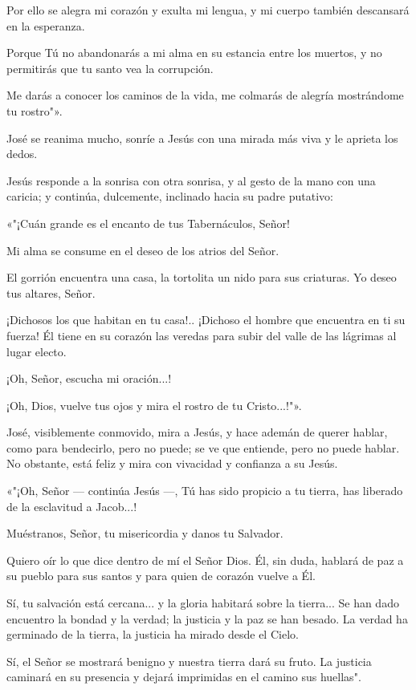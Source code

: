 \documentclass[12pt, twoside, openright]{book} %
\begin{document}
Por ello se alegra mi corazón y exulta mi lengua, y mi cuerpo también descansará en la esperanza. 

Porque Tú no abandonarás a mi alma en su estancia entre los muertos, y no permitirás que tu santo vea la corrupción. 

Me darás a conocer los caminos de la vida, me colmarás de alegría mostrándome tu rostro"». 

José se reanima mucho, sonríe a Jesús con una mirada más viva y le aprieta los dedos. 

Jesús responde a la sonrisa con otra sonrisa, y al gesto de la mano con una caricia; y continúa, dulcemente, inclinado hacia su padre putativo: 

«"¡Cuán grande es el encanto de tus Tabernáculos, Señor! 

Mi alma se consume en el deseo de los atrios del Señor. 

El gorrión encuentra una casa, la tortolita un nido para sus criaturas. Yo deseo tus altares, Señor. 

¡Dichosos los que habitan en tu casa!.. ¡Dichoso el hombre que encuentra en ti su fuerza! Él tiene en su corazón las veredas para subir del valle de las lágrimas al lugar electo. 

¡Oh, Señor, escucha mi oración...! 

¡Oh, Dios, vuelve tus ojos y mira el rostro de tu Cristo...!"». 

José, visiblemente conmovido, mira a Jesús, y hace ademán de querer hablar, como para bendecirlo, pero no puede; se ve que entiende, pero no puede hablar. No obstante, está feliz y mira con vivacidad y confianza a su Jesús. 

«"¡Oh, Señor — continúa Jesús —, Tú has sido propicio a tu tierra, has liberado de la esclavitud a Jacob...! 

Muéstranos, Señor, tu misericordia y danos tu Salvador. 

Quiero oír lo que dice dentro de mí el Señor Dios. Él, sin duda, hablará de paz a su pueblo para sus santos y para quien de corazón vuelve a Él. 

Sí, tu salvación está cercana... y la gloria habitará sobre la tierra... Se han dado encuentro la bondad y la verdad; la justicia y la paz se han besado. La verdad ha germinado de la tierra, la justicia ha mirado desde el Cielo. 

Sí, el Señor se mostrará benigno y nuestra tierra dará su fruto. La justicia caminará en su presencia y dejará imprimidas en el camino sus huellas". 
\end{document}
